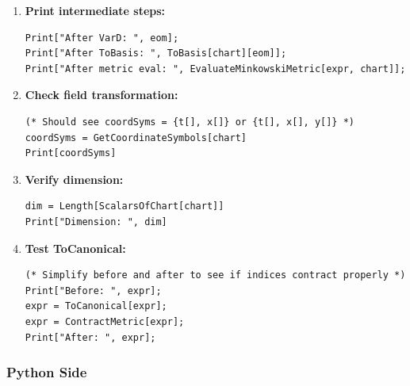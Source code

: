\begin{enumerate}
  \item \textbf{Print intermediate steps:}

\begin{lstlisting}[style=mathematica]
Print["After VarD: ", eom];
Print["After ToBasis: ", ToBasis[chart][eom]];
Print["After metric eval: ", EvaluateMinkowskiMetric[expr, chart]];
\end{lstlisting}

  \item \textbf{Check field transformation:}

\begin{lstlisting}[style=mathematica]
(* Should see coordSyms = {t[], x[]} or {t[], x[], y[]} *)
coordSyms = GetCoordinateSymbols[chart]
Print[coordSyms]
\end{lstlisting}

  \item \textbf{Verify dimension:}

\begin{lstlisting}[style=mathematica]
dim = Length[ScalarsOfChart[chart]]
Print["Dimension: ", dim]
\end{lstlisting}

  \item \textbf{Test ToCanonical:}

\begin{lstlisting}[style=mathematica]
(* Simplify before and after to see if indices contract properly *)
Print["Before: ", expr];
expr = ToCanonical[expr];
expr = ContractMetric[expr];
Print["After: ", expr];
\end{lstlisting}
\end{enumerate}

\subsubsection{Python Side}

